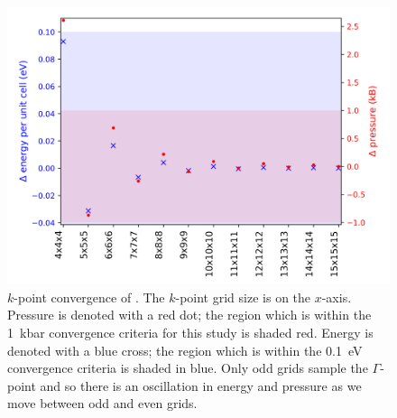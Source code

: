 \begin{figure}[h]
\centering
  \includegraphics[resolution=450]{figures/ch3/kpointconvergence.png}
  \caption[$k$-point convergence of ]{$k$-point convergence of . The $k$-point grid size is on the $x$-axis. Pressure is denoted with a red dot; the region which is within the \SI{1}{\kilo\bar} convergence criteria for this study is shaded red. Energy is denoted with a blue cross; the region which is within the \SI{0.1}{\electronvolt} convergence criteria  is shaded in blue. Only odd grids sample the $\Gamma$-point and so there is an oscillation in energy and pressure as we move between odd and even grids.}
  \label{kpointconvergence}
\end{figure}







